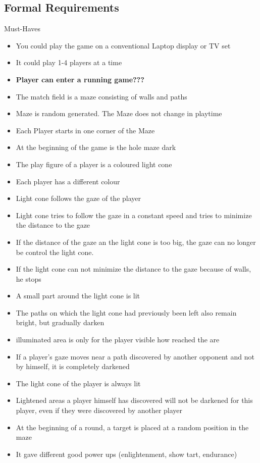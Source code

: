 \documentclass{sigchi}
\begin{document}
\subsection{Formal Requirements}
	Must-Haves
	\begin{itemize}
		\item You could play the game on a conventional Laptop display or TV set
		\item It could play 1-4 players at a time 
		\item \textbf{Player can enter a running game???} 
		\item The match field is a maze consisting of walls and paths 
		\item Maze is random generated. The Maze does not change in playtime
		\item Each Player starts in one corner of the Maze
		\item At the beginning of the game is the hole maze dark
		\item The play figure of a player is a coloured light cone
		\item Each player has a different colour
		\item Light cone follows the gaze of the player
		\item Light cone tries to follow the gaze in a constant speed and tries to minimize the distance to the gaze
		\item If the distance of the gaze an the light cone is too big, the gaze can no longer be control the light cone.
		\item 	If the light cone can not minimize the distance to the gaze because of walls, he stops
		\item 	A small part around the light cone is lit
		\item The paths on which the light cone had previously been left also remain bright, but gradually darken
		\item 	illuminated area is only for the player visible how reached the are
		\item If a player's gaze moves near a path discovered by another opponent and not by himself, it is completely darkened 
		\item 	The light cone of the player is always lit
		\item 	Lightened areas a player himself has discovered will not be darkened for this player, even if they were discovered by another player
		\item At the beginning of a round, a target is placed at a random position in the maze
		\item It gave different good power ups (enlightenment, show tart, endurance)
	\end{itemize}
\end{document}
